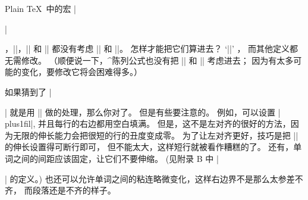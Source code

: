 \dangerexercise \1Plain \TeX\ 中的宏 |\centerline|，|\leftline|，|\rightline|
和 |\line| 都没有考虑 |\leftskip| 和 |\rightskip|。%
怎样才能把它们算进去？
\answer `|\def\line#1{\hbox to \hsize{\hskip\leftskip#1\hskip\rightskip}}|' ，
而其他定义都无需修改。%
（顺便说一下，^{陈列公式}也没有把 |\leftskip| 和 |\rightskip| 考虑进去；
因为有太多可能的变化，要修改它将会困难得多。）

\ddanger 如果猜到了 |\raggedright| 就是用 |\rightskip| 做的处理，那么你对了。%
但是有些要注意的。%
例如，可以设置 |\rightskip=0pt plus1fil|, 并且每行的右边都用空白填满。%
但是，这不是左对齐的很好的方法，因为无限的伸长能力会把很短的行的丑度变成零。%
为了让左对齐更好，技巧是把 |\rightskip| 的伸长设置得可断行即可，
但不能太大，这样短行就被看作糟糕的了。%
还有，单词之间的间距应该固定，让它们不要伸缩。%
(见附录 B 中 |\raggedright| 的定义。)
也还可以允许单词之间的粘连略微变化，这样右边界不是那么太参差不齐，
而段落还是不齐的样子。

